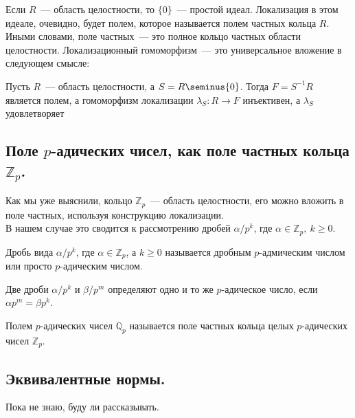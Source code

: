 \documentclass[11pt]{article}
\begin{document}
    Если $R$~--- область целостности, то $\{ 0 \}$~--- простой идеал. Локализация в этом идеале, очевидно,
    будет полем, которое называется полем частных кольца $R$.\\

    Иными словами, поле частных~--- это полное кольцо частных области целостности. Локализационный гомоморфизм~--- это
    универсальное вложение в следующем смысле:

    \begin{lemma}
        Пусть $R$~--- область целостности, а $S = R\seminus \{ 0 \}$. Тогда $F = S^{-1}R$ является полем, а гомоморфизм
        локализации $\lambda_{S}\colon R \to F$ инъективен, а $\lambda_{S}$ удовлетворяет 
    \end{lemma}

    \subsection{Поле $p$-адических чисел, как поле частных кольца $\mathbb{Z}_p$.}

    Как мы уже выяснили, кольцо $\mathbb{Z}_p$~--- область целостности, его можно вложить в поле частных, используя
    конструкцию локализации.\\
    В нашем случае это сводится к рассмотрению дробей $\alpha / p^k$, где $\alpha \in \mathbb{Z}_p, \ k \ge 0$.
    \begin{definition}
        Дробь вида $\alpha / p^k$, где $\alpha \in \mathbb{Z}_p$, а $k \ge 0$ называется дробным $p$-адмическим числом
        или просто $p$-адическим числом.
    \end{definition}
    \begin{remark}
         Две дроби $\alpha / p^k$ и $\beta / p^m$ определяют одно и то же $p$-адическое число, если $\alpha p^m = \beta p^k$.
    \end{remark}

    \begin{definition}
        Полем  $p$-адических чисел $\mathbb{Q}_p$ называется поле частных кольца целых $p$-адических чисел $\mathbb{Z}_p$.
    \end{definition}

    \begin{theorem}

    \end{theorem}

    \subsection{Эквивалентные нормы.}
    Пока не знаю, буду ли рассказывать.
\end{document}
